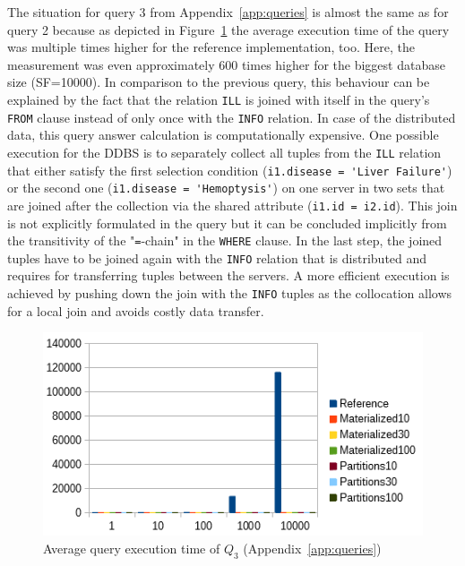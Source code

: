 The situation for query 3 from Appendix~\ref{app:queries} is almost the same as for query 2 because as depicted in Figure~\ref{fig:query3} the average execution
time of the query was multiple times higher for the reference implementation, too. Here, the measurement was even approximately 600 times higher for the biggest
database size (SF=10000). In comparison to the previous query, this behaviour can be explained by the fact that the relation \verb!ILL! is joined with itself in
the query's \verb!FROM! clause instead of only once with the \verb!INFO! relation. In case of the distributed data, this query answer calculation is 
computationally expensive. One possible execution for the DDBS is to separately collect all tuples from the \verb!ILL! relation that either satisfy the first 
selection condition (\verb!i1.disease = 'Liver Failure'!) or the second one (\verb!i1.disease = 'Hemoptysis'!) on one server in two sets that are joined after 
the collection via the shared attribute (\verb!i1.id = i2.id!). This join is not explicitly formulated in the query but it can be concluded implicitly from the 
transitivity of the "\verb!=!-chain" in the \verb!WHERE! clause. In the last step, the joined tuples have to be joined again with the \verb!INFO! relation that 
is distributed and requires for transferring tuples between the servers. A more efficient execution is achieved by pushing down the join with the \verb!INFO!
tuples as the collocation allows for a local join and avoids costly data transfer.
\begin{figure}[h]
    \centering
    \includegraphics[scale=0.9]{charts/Query3.png}
    \caption{Average query execution time of $Q_3$ (Appendix~\ref{app:queries})}
    \label{fig:query3}
\end{figure}


